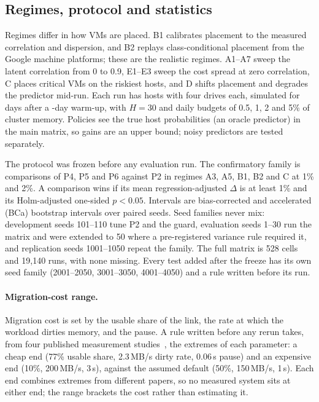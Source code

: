 \documentclass[pdflatex,sn-mathphys-num,iicol]{sn-jnl}
\theoremstyle{thmstyleone}%
\theoremstyle{thmstylethree}%
\begin{document}
\subsection{Regimes, protocol and statistics}\label{sec:protocol}

Regimes differ in how VMs are placed. B1 calibrates placement to the measured correlation and
dispersion, and B2 replays class-conditional placement from the Google machine platforms; these are
the realistic regimes. A1--A7 sweep the latent correlation from 0 to 0.9, E1--E3 sweep the cost
spread at zero correlation, C places critical VMs on the riskiest hosts, and D shifts placement
and degrades the predictor mid-run. Each run has \VHosts{} hosts with four drives each, simulated for
\VHorizonDays{} days after a \VWarmupDays-day warm-up, with $H = 30$ and daily budgets of 0.5, 1, 2
and 5\% of cluster memory. Policies see the true host probabilities (an oracle predictor) in the
main matrix, so gains are an upper bound; noisy predictors are tested separately.

The protocol was frozen before any evaluation run. The confirmatory family is \VFamilySize{}
comparisons of P4, P5 and P6 against P2 in regimes A3, A5, B1, B2 and C at 1\% and 2\%. A
comparison wins if its mean regression-adjusted $\Delta$ is at least 1\% and its Holm-adjusted
one-sided $p < 0.05$. Intervals are bias-corrected and accelerated (BCa) bootstrap intervals over
paired seeds. Seed families never mix: development seeds 101--110 tune P2 and the guard,
evaluation seeds 1--30 run the matrix and were extended to 50 where a pre-registered variance rule
required it, and replication seeds 1001--1050 repeat the family. The full matrix is 528 cells and
19{,}140 runs, with none missing. Every test added after the freeze has its own seed family
(2001--2050, 3001--3050, 4001--4050) and a rule written before its run.

\paragraph{Migration-cost range.} Migration cost is set by the usable share of the link, the rate
at which the workload dirties memory, and the pause. A rule written before any rerun takes, from
four published measurement studies~\cite{clark2005live,voorsluys2009cost,akoush2010predicting,hu2013quantitative},
the extremes of each parameter: a cheap end (77\% usable share, 2.3\,MB/s dirty rate, 0.06\,s
pause) and an expensive end (10\%, 200\,MB/s, 3\,s), against the assumed default (50\%,
150\,MB/s, 1\,s). Each end combines extremes from different papers, so no measured system sits at
either end; the range brackets the cost rather than estimating it.
\end{document}
